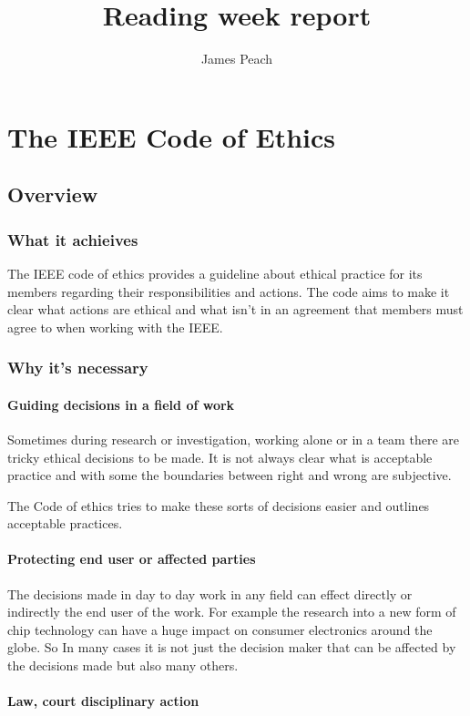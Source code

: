 \documentclass[a4paper]{article}
\author{James Peach}
\title{Reading week report}
\begin{document}
\tableofcontents
\newpage
\maketitle
\section{The IEEE Code of Ethics}
\subsection{Overview}
\subsubsection{What it achieives}

The IEEE code of ethics provides a guideline about ethical practice for its members regarding their responsibilities and actions. 
The code aims to make it clear what actions are ethical and what isn’t in an agreement that members must agree to when working with the IEEE.
\subsubsection{Why it's necessary}
\paragraph{Guiding decisions in a field of work}

Sometimes during research or investigation, working alone or in a team there are tricky ethical decisions to be made. It is not always clear what is acceptable practice and with some the boundaries between right and wrong are subjective.

The Code of ethics tries to make these sorts of decisions easier and outlines acceptable practices.
\paragraph{Protecting end user or affected parties}

The decisions made in day to day work in any field can effect directly or indirectly the end user of the work. For example the research into a new form of chip technology can have a huge impact on consumer electronics around the globe. So In many cases it is not just the decision maker that can be affected by the decisions made but also many others.
\paragraph{Law, court disciplinary action}
\end{document}
